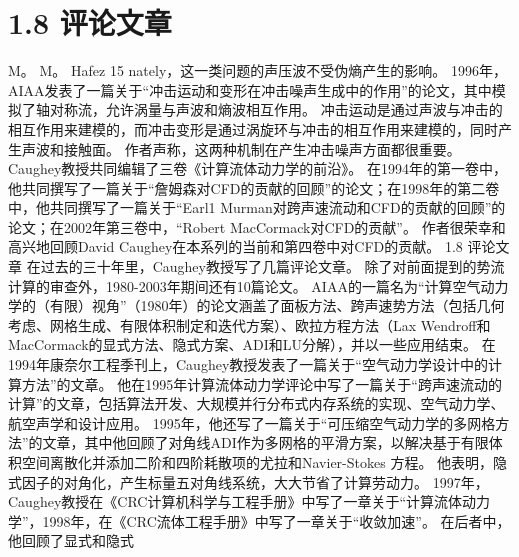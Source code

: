 \documentclass[UTF8,11pt,a4paper,openany,fontset=fandol]{ctexbook}
\begin{document}
\section{1.8 评论文章}
M。 M。 Hafez 15 nately，这一类问题的声压波不受伪熵产生的影响。 1996年，AIAA发表了一篇关于“冲击运动和变形在冲击噪声生成中的作用”的论文，其中模拟了轴对称流，允许涡量与声波和熵波相互作用。 冲击运动是通过声波与冲击的相互作用来建模的，而冲击变形是通过涡旋环与冲击的相互作用来建模的，同时产生声波和接触面。 作者声称，这两种机制在产生冲击噪声方面都很重要。 Caughey教授共同编辑了三卷《计算流体动力学的前沿》。 在1994年的第一卷中，他共同撰写了一篇关于“詹姆森对CFD的贡献的回顾”的论文；在1998年的第二卷中，他共同撰写了一篇关于“Earl1 Murman对跨声速流动和CFD的贡献的回顾”的论文；在2002年第三卷中，“Robert MacCormack对CFD的贡献”。 作者很荣幸和高兴地回顾David Caughey在本系列的当前和第四卷中对CFD的贡献。 1.8 评论文章 在过去的三十年里，Caughey教授写了几篇评论文章。 除了对前面提到的势流计算的审查外，1980-2003年期间还有10篇论文。 AIAA的一篇名为“计算空气动力学的（有限）视角”（1980年）的论文涵盖了面板方法、跨声速势方法（包括几何考虑、网格生成、有限体积制定和迭代方案）、欧拉方程方法（Lax Wendroff和MacCormack的显式方法、隐式方案、ADI和LU分解），并以一些应用结束。 在1994年康奈尔工程季刊上，Caughey教授发表了一篇关于“空气动力学设计中的计算方法”的文章。 他在1995年计算流体动力学评论中写了一篇关于“跨声速流动的计算”的文章，包括算法开发、大规模并行分布式内存系统的实现、空气动力学、航空声学和设计应用。 1995年，他还写了一篇关于“可压缩空气动力学的多网格方法”的文章，其中他回顾了对角线ADI作为多网格的平滑方案，以解决基于有限体积空间离散化并添加二阶和四阶耗散项的尤拉和Navier-Stokes 方程。 他表明，隐式因子的对角化，产生标量五对角线系统，大大节省了计算劳动力。 1997年，Caughey教授在《CRC计算机科学与工程手册》中写了一章关于“计算流体动力学”，1998年，在《CRC流体工程手册》中写了一章关于“收敛加速”。 在后者中，他回顾了显式和隐式
\end{document}
